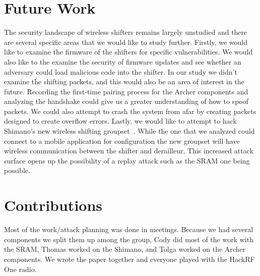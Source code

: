 \documentclass[letterpaper,twocolumn,10pt]{article}
\begin{document}
\section{Future Work}

The security landscape of wireless shifters remains largely unstudied and there are several specific areas that we would like to study further. Firstly, we would like to examine the firmware of the shifters for specific vulnerabilities. We would also like to the examine the security of firmware updates and see whether an adversary could load malicious code into the shifter. In our study we didn’t examine the shifting packets, and this would also be an area of interest in the future. Recording the first-time pairing process for the Archer components and analyzing the handshake could give us a greater understanding of how to spoof packets. We could also attempt to crash the system from afar by creating packets designed to create overflow errors. Lastly, we would like to attempt to hack Shimano’s new wireless shifting groupset~\cite{newshimano}. While the one that we analyzed could connect to a mobile application for configuration the new groupset will have wireless communication between the shifter and derailleur. This increased attack surface opens up the possibility of a replay attack such as the SRAM one being possible. 


  {\normalsize 
  }

\section{Contributions}

Most of the work/attack planning was done in meetings. Because we had several components we split them up among the group, Cody did most of the work with the SRAM, Thomas worked on the Shimano, and Tolga worked on the Archer components. We wrote the paper together and everyone played with the HackRF One radio.

\end{document}
